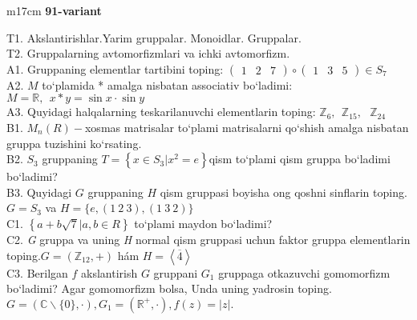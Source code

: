 \documentclass{article}
\begin{document}
\begin{tabular}{m{17cm}}
\textbf{91-variant}
\newline

T1. Akslantirishlar.Yarim gruppalar. Monoidlar. Gruppalar. \\
T2. Gruppalarning avtomorfizmlari va ichki avtomorfizm. \\
A1. Gruppaning elementlar tartibini toping: \(\begin{pmatrix}
1 & 2 & 7
\end{pmatrix} \circ \begin{pmatrix}
1 & 3 & 5
\end{pmatrix} \in S_{7}\) \\
A2. \(M\) to`plamida * amalga nisbatan associativ bo`ladimi: \(M\mathbb{= R},\ \ x*y = \sin x \cdot \sin y\) \\
A3. Quyidagi halqalarning teskarilanuvchi elementlarin toping: \(\mathbb{Z}_{6},\ \ \mathbb{Z}_{15},\ \ \ \mathbb{Z}_{24}\) \\
B1. \(M_{n}(R) -\)xosmas matrisalar to`plami matrisalarni qo`shish amalga nisbatan gruppa tuzishini ko`rsating. \\
B2. \(S_{3}\) gruppaning \(T = \left\{ x \in S_{3}|x^{2} = e \right\}\)qism to`plami qism gruppa bo`ladimi bo`ladimi? \\
B3. Quyidagi \(G\) gruppaning \(H\) qism gruppasi boyisha o\textquotesingle ng qo\textquotesingle shni sinflarin toping. \(G = S_{3}\) va \(H = \{ e,(1\ 2\ 3),(1\ 3\ 2)\}\) \\
C1. \(\left\{ a + b\sqrt{7}|a,b \in R \right\}\) to`plami maydon bo`ladimi? \\
C2. \emph{G} gruppa va uning \emph{H} normal qism gruppasi uchun faktor gruppa elementlarin toping.\(G = (\mathbb{Z}_{12}, + )\) hám \(H = \left\langle \overline{4} \right\rangle\) \\
C3. Berilgan \(f\) akslantirish \(G\) gruppani \(G_{1}\) gruppaga o\textquotesingle tkazuvchi gomomorfizm bo`ladimi? Agar gomomorfizm bolsa, Unda uning yadrosin toping.\(G = (\mathbb{C}\backslash\{ 0\}, \cdot ),G_{1} = \left( \mathbb{R}^{+}, \cdot \right),f(z) = |z|.\) \\

\end{tabular}
\vspace{1cm}
\end{document}
